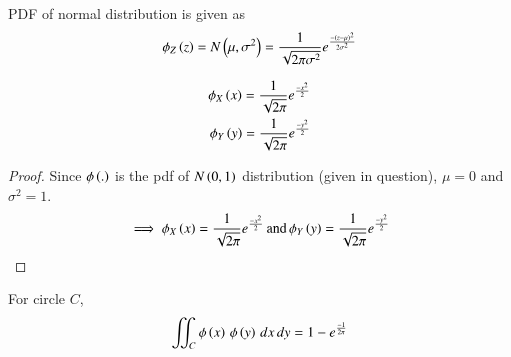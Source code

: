\begin{definition}
    PDF of normal distribution is given as
    \begin{align}
        \phi_Z\left(z\right) = N\left(\mu,\sigma^2\right) = \frac{1}{\sqrt{2\pi\sigma^2}}e^\frac{-\left(z-\mu\right)^2}{2\sigma^2}
    \end{align}
    \end{definition}
    \begin{corollary}
    \begin{align}
        \phi_X\left(x\right) = \frac{1}{\sqrt{2\pi}}e^\frac{-x^2}{2}\label{gauss/5/eq1}\\
        \phi_Y\left(y\right) = \frac{1}{\sqrt{2\pi}}e^\frac{-y^2}{2}\label{gauss/5/eq2}
    \end{align}
    \end{corollary}
    \begin{proof}
    Since $\phi\left(.\right)$ is the pdf of $N\left(0,1\right)$ distribution (given in question),
    $\mu = 0$ and $\sigma^2 = 1$.
    \begin{align*}
        \implies \phi_X\left(x\right) = \frac{1}{\sqrt{2\pi}}e^\frac{-x^2}{2}\,\text{and}\,
        \phi_Y\left(y\right) = \frac{1}{\sqrt{2\pi}}e^\frac{-y^2}{2}
    \end{align*}
    \end{proof}
    \begin{lemma}
    For circle $C$,
    \begin{align}
        \iint_C{\phi\left(x\right)\,\phi\left(y\right)\,dx\,dy} = 1 - e^{\frac{-1}{2\pi}}  \label{gauss/5/eq9}
    \end{align}
    \end{lemma}
